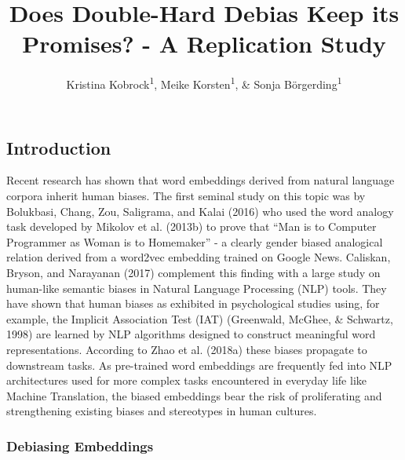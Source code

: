 \documentclass[
  english,
  man,floatsintext]{apa6}
\title{Does Double-Hard Debias Keep its Promises? - A Replication Study}
\author{Kristina Kobrock\textsuperscript{1}, Meike Korsten\textsuperscript{1}, \& Sonja Börgerding\textsuperscript{1}}
\date{}
\affiliation{\vspace{0.5cm}\textsuperscript{1} University of Osnabrück}
\begin{document}
\maketitle

\hypertarget{introduction}{%
\subsection{Introduction}\label{introduction}}

Recent research has shown that word embeddings derived from natural language corpora inherit human biases. The first seminal study on this topic was by Bolukbasi, Chang, Zou, Saligrama, and Kalai (2016) who used the word analogy task developed by Mikolov et al. (2013b) to prove that \enquote{Man is to Computer Programmer as Woman is to Homemaker} - a clearly gender biased analogical relation derived from a word2vec embedding trained on Google News. Caliskan, Bryson, and Narayanan (2017) complement this finding with a large study on human-like semantic biases in Natural Language Processing (NLP) tools. They have shown that human biases as exhibited in psychological studies using, for example, the Implicit Association Test (IAT) (Greenwald, McGhee, \& Schwartz, 1998) are learned by NLP algorithms designed to construct meaningful word representations. According to Zhao et al. (2018a) these biases propagate to downstream tasks. As pre-trained word embeddings are frequently fed into NLP architectures used for more complex tasks encountered in everyday life like Machine Translation, the biased embeddings bear the risk of proliferating and strengthening existing biases and stereotypes in human cultures.

\hypertarget{debiasing-embeddings}{%
\subsubsection{Debiasing Embeddings}\label{debiasing-embeddings}}
\end{document}
